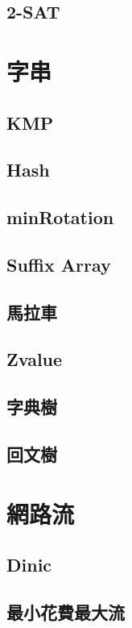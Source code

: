 \documentclass[a4paper,10pt,twocolumn,oneside]{article}
\begin{document}
\subsection{2-SAT}


\section{字串}
\subsection{KMP}

\subsection{Hash}

\subsection{minRotation}

\subsection{Suffix Array}

\subsection{馬拉車}

\subsection{Zvalue}

\subsection{字典樹}

\subsection{回文樹}



\section{網路流}
\subsection{Dinic}

\subsection{最小花費最大流}

\end{document}
